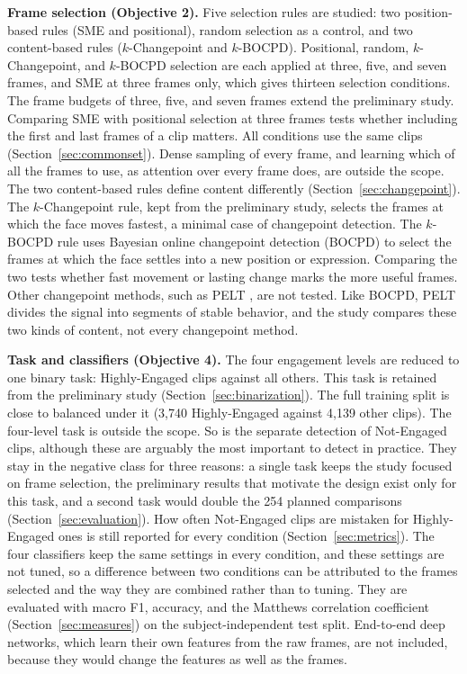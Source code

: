 \textbf{Frame selection (Objective 2).} Five selection rules are studied: two position-based rules (SME and positional), random selection as a control, and two content-based rules ($k$-Changepoint and $k$-BOCPD). Positional, random, $k$-Changepoint, and $k$-BOCPD selection are each applied at three, five, and seven frames, and SME at three frames only, which gives thirteen selection conditions. The frame budgets of three, five, and seven frames extend the preliminary study. Comparing SME with positional selection at three frames tests whether including the first and last frames of a clip matters. All conditions use the same clips (Section~\ref{sec:commonset}). Dense sampling of every frame, and learning which of all the frames to use, as attention over every frame does, are outside the scope. The two content-based rules define content differently (Section~\ref{sec:changepoint}). The $k$-Changepoint rule, kept from the preliminary study, selects the frames at which the face moves fastest, a minimal case of changepoint detection. The $k$-BOCPD rule uses Bayesian online changepoint detection (BOCPD) \cite{adams2007} to select the frames at which the face settles into a new position or expression. Comparing the two tests whether fast movement or lasting change marks the more useful frames. Other changepoint methods, such as PELT \cite{killick2012}, are not tested. Like BOCPD, PELT divides the signal into segments of stable behavior, and the study compares these two kinds of content, not every changepoint method.

\textbf{Task and classifiers (Objective 4).} The four engagement levels are reduced to one binary task: Highly-Engaged clips against all others. This task is retained from the preliminary study (Section~\ref{sec:binarization}). The full training split is close to balanced under it (3,740 Highly-Engaged against 4,139 other clips). The four-level task is outside the scope. So is the separate detection of Not-Engaged clips, although these are arguably the most important to detect in practice. They stay in the negative class for three reasons: a single task keeps the study focused on frame selection, the preliminary results that motivate the design exist only for this task, and a second task would double the 254 planned comparisons (Section~\ref{sec:evaluation}). How often Not-Engaged clips are mistaken for Highly-Engaged ones is still reported for every condition (Section~\ref{sec:metrics}). The four classifiers keep the same settings in every condition, and these settings are not tuned, so a difference between two conditions can be attributed to the frames selected and the way they are combined rather than to tuning. They are evaluated with macro F1, accuracy, and the Matthews correlation coefficient (Section~\ref{sec:measures}) on the subject-independent test split. End-to-end deep networks, which learn their own features from the raw frames, are not included, because they would change the features as well as the frames.

